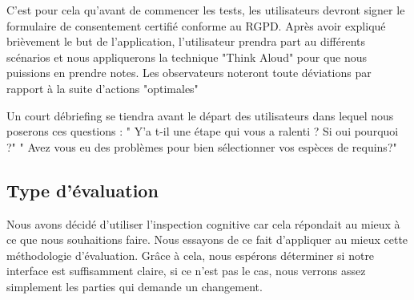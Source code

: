 \documentclass{article}
\begin{document}
C'est pour cela qu'avant de commencer les tests, les utilisateurs devront signer le formulaire de consentement certifié conforme au RGPD. Après avoir expliqué brièvement le but de l'application, l'utilisateur prendra part au différents scénarios et nous appliquerons la technique "Think Aloud" pour que nous puissions en prendre notes.
Les observateurs noteront toute déviations par rapport à la suite d'actions "optimales"

Un court débriefing se tiendra avant le départ des utilisateurs dans lequel nous poserons ces questions :
" Y'a t-il une étape qui vous a ralenti ? Si oui pourquoi ?"
" Avez vous eu des problèmes pour bien sélectionner vos espèces de requins?"
\subsection{Type d'évaluation}
Nous avons décidé d'utiliser l'inspection cognitive car cela répondait au mieux à ce que nous souhaitions faire. Nous essayons de ce fait d'appliquer au mieux cette méthodologie d'évaluation. Grâce à cela, nous espérons déterminer si notre interface est suffisamment claire, si ce n'est pas le cas, nous verrons assez simplement les parties qui demande un changement.
\end{document}
